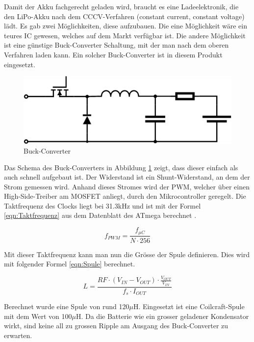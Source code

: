 Damit der Akku fachgerecht geladen wird, braucht es eine Ladeelektronik, die den LiPo-Akku nach dem CCCV-Verfahren (constant current, constant voltage) lädt. Es gab zwei Möglichkeiten, diese aufzubauen. Die eine Möglichkeit wäre ein teures IC gewesen, welches auf dem Markt verfügbar ist. Die andere Möglichkeit ist eine günstige Buck-Converter Schaltung, mit der man nach dem oberen Verfahren laden kann. Ein solcher Buck-Converter ist in diesem Produkt eingesetzt.

\begin{figure} [H]
	\centering
	\includegraphics[width=0.6\linewidth]{images/Buck_Converter}
	\caption{Buck-Converter}
	\label{fig:Buck_Converter}
\end{figure}

Das Schema des Buck-Converters in Abbildung \ref{fig:Buck_Converter} zeigt, dass dieser einfach als auch schnell aufgebaut ist. Der Widerstand ist ein Shunt-Widerstand, an dem der Strom gemessen wird. Anhand dieses Stromes wird der PWM, welcher über einen High-Side-Treiber am MOSFET anliegt, durch den Mikrocontroller geregelt. Die Taktfrequenz des Clocks liegt bei 31.3kHz und ist mit der Formel \eqref{eqn:Taktfrequenz} aus dem Datenblatt des ATmega berechnet \cite{DatenblattATMEGA}.

\begin{equation}
f_{ PWM }=\frac { { f }_{ \mu C } }{ N\cdot256 } 
\label{eqn:Taktfrequenz}
\end{equation}

Mit dieser Taktfrequenz kann man nun die Grösse der Spule definieren. Dies wird mit folgender Formel \eqref{eqn:Spule} berechnet.

\begin{equation}
L=\frac { RF\cdot\left( { V }_{ IN }-{ V }_{ OUT } \right) \cdot\frac { { V }_{ OUT } }{ { V }_{ IN } }  }{ { f }_{ s }\cdot{ I }_{ OUT } }  
\label{eqn:Spule}
\end{equation}

Berechnet wurde eine Spule von rund 120$\mu$H. Eingesetzt ist eine Coilcraft-Spule mit dem Wert von 100$\mu$H. Da die Batterie wie ein grosser geladener Kondensator wirkt, sind keine all zu grossen Ripple am Ausgang des Buck-Converter zu erwarten.


